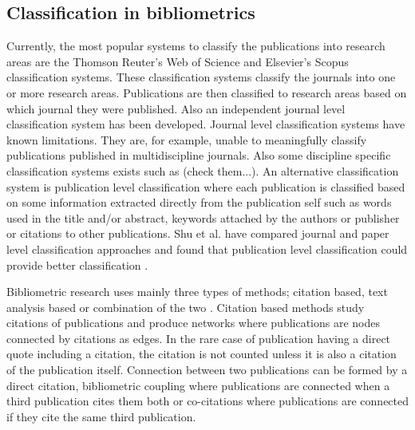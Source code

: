 \subsection{Classification in bibliometrics}
Currently, the most popular systems to classify the publications 
into research areas are the Thomson 
Reuter's Web of Science and Elsevier's Scopus classification
systems. These classification systems classify the journals into
one or more research areas. \cite{waltman_new_2012} Publications
are then classified to research areas based on which journal they
were published. 
Also an independent journal level classification system has been 
developed. \cite{archambault_towards_2011}
Journal level classification systems have known limitations.
They are, for example, unable to meaningfully classify
publications published in multidiscipline journals.
Also some discipline specific classification systems exists such 
as (check them...).
An alternative classification system is publication level 
classification where each publication is classified based on some 
information extracted directly from the publication self such as
words used in the title and/or abstract, keywords attached by the
authors or publisher or citations to other publications.
Shu et al. have compared journal and paper level classification
approaches and found that publication level classification could
provide better classification \cite{shu_comparing_2019}.

Bibliometric research 
uses mainly three types of methods; citation based, text analysis 
based or combination of the two \cite{janssens_hybrid_2009}.
Citation based methods study citations of publications and produce
networks where publications are nodes connected by citations as 
edges. In
 the rare case of publication having a direct quote including a
 citation, the citation is not counted unless it is also a
 citation of the publication itself.
Connection between two publications can be 
formed by a direct citation, bibliometric coupling where 
publications are connected when a third publication cites them 
both or co-citations where publications are connected if they 
cite the same third publication.

